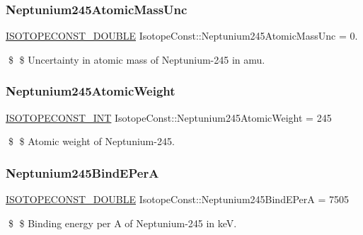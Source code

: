 \subsubsection{\texorpdfstring{Neptunium245\+Atomic\+Mass\+Unc}{Neptunium245AtomicMassUnc}}
{\footnotesize\ttfamily \mbox{\hyperlink{group___isotope_const-_macros_ga8f45a7272ce02c0b4c65c44636ed719a}{I\+S\+O\+T\+O\+P\+E\+C\+O\+N\+S\+T\+\_\+\+D\+O\+U\+B\+LE}} Isotope\+Const\+::\+Neptunium245\+Atomic\+Mass\+Unc = 0.}

\$ \$ Uncertainty in atomic mass of Neptunium-\/245 in amu. \mbox{\label{group___isotope_const-_neptunium-_np245_gaf84979c91de6dbdd6d27693ec181117b}} 
\subsubsection{\texorpdfstring{Neptunium245\+Atomic\+Weight}{Neptunium245AtomicWeight}}
{\footnotesize\ttfamily \mbox{\hyperlink{group___isotope_const-_macros_ga5f18360b3e99483a35c32d789e62621c}{I\+S\+O\+T\+O\+P\+E\+C\+O\+N\+S\+T\+\_\+\+I\+NT}} Isotope\+Const\+::\+Neptunium245\+Atomic\+Weight = 245}

\$ \$ Atomic weight of Neptunium-\/245. \mbox{\label{group___isotope_const-_neptunium-_np245_gaf62d056f4db1661844f5416d3cd0b869}} 
\subsubsection{\texorpdfstring{Neptunium245\+Bind\+E\+PerA}{Neptunium245BindEPerA}}
{\footnotesize\ttfamily \mbox{\hyperlink{group___isotope_const-_macros_ga8f45a7272ce02c0b4c65c44636ed719a}{I\+S\+O\+T\+O\+P\+E\+C\+O\+N\+S\+T\+\_\+\+D\+O\+U\+B\+LE}} Isotope\+Const\+::\+Neptunium245\+Bind\+E\+PerA = 7505}

\$ \$ Binding energy per A of Neptunium-\/245 in keV. \mbox{\label{group___isotope_const-_neptunium-_np245_ga7e03f83b271e4b22a377e98750c1a90d}} 
